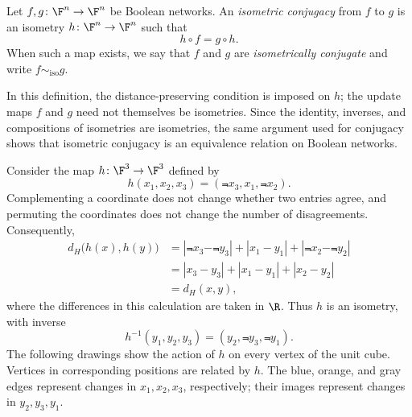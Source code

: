 \begin{definition}\label{def:isometric-conjugacy}
    Let $f,g\colon\F^n\to\F^n$ be Boolean networks. An \emph{isometric conjugacy} from $f$ to $g$ is an isometry $h\colon\F^n\to\F^n$ such that
    \[
        h\circ f=g\circ h.
    \]
    When such a map exists, we say that $f$ and $g$ are \emph{isometrically conjugate} and write $f\sim_{\mathrm{iso}}g$.
\end{definition}

In this definition, the distance-preserving condition is imposed on $h$; the update maps $f$ and $g$ need not themselves be isometries. Since the identity, inverses, and compositions of isometries are isometries, the same argument used for conjugacy shows that isometric conjugacy is an equivalence relation on Boolean networks.

\begin{example}\label{ex:coordinate-isometry}
    Consider the map $h\colon\F^3\to\F^3$ defined by
    \[
        h(x_1,x_2,x_3)=(\Not{x}_3,x_1,\Not{x}_2).
    \]
    Complementing a coordinate does not change whether two entries agree, and permuting the coordinates does not change the number of disagreements. Consequently,
    \begin{align*}
        d_H\bigl(h(x),h(y)\bigr)
        &=|\Not{x}_3-\Not{y}_3|+|x_1-y_1|+|\Not{x}_2-\Not{y}_2|\\
        &=|x_3-y_3|+|x_1-y_1|+|x_2-y_2|\\
        &=d_H(x,y),
    \end{align*}
    where the differences in this calculation are taken in $\R$. Thus $h$ is an isometry, with inverse
    \[
        h^{-1}(y_1,y_2,y_3)=(y_2,\Not{y}_3,\Not{y}_1).
    \]
    The following drawings show the action of $h$ on every vertex of the unit cube. Vertices in corresponding positions are related by $h$. The blue, orange, and gray edges represent changes in $x_1,x_2,x_3$, respectively; their images represent changes in $y_2,y_3,y_1$.


\end{example}
